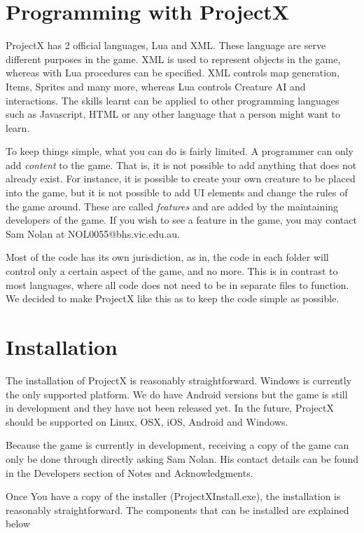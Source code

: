 \documentclass{book}
\begin{document}
	\section{Programming with ProjectX}
	ProjectX has 2 official languages, Lua and XML. These language are serve different purposes in the game. XML is used to represent objects in the game, whereas with Lua procedures can be specified. XML controls map generation, Items, Sprites and many more, whereas Lua controls Creature AI and interactions. The skills learnt can be applied to other programming languages such as Javascript, HTML or any other language that a person might want to learn.
	
	To keep things simple, what you can do is fairly limited. A programmer can only add \textit{content} to the game. That is, it is not possible to add anything that does not already exist. For instance, it is possible to create your own creature to be placed into the game, but it is not possible to add UI elements and change the rules of the game around. These are called \textit{features} and are added by the maintaining developers of the game. If you wish to see a feature in the game, you may contact Sam Nolan at NOL0055@bhs.vic.edu.au.
	
	Most of the code has its own jurisdiction, as in, the code in each folder will control only a certain aspect of the game, and no more. This is in contrast to most languages, where all code does not need to be in separate files to function. We decided to make ProjectX like this as to keep the code simple as possible.
	
	\section{Installation}
	The installation of ProjectX is reasonably straightforward. Windows is currently the only supported platform. We do have Android versions but the game is still in development and they have not been released yet. In the future, ProjectX should be supported on Linux, OSX, iOS, Android and Windows.
	
	Because the game is currently in development, receiving a copy of the game can only be done through directly asking Sam Nolan. His contact details can be found in the Developers section of Notes and Acknowledgments.  
	
	Once You have a copy of the installer (ProjectXInstall.exe), the installation is reasonably straightforward. The components that can be installed are explained below
	
\end{document}
